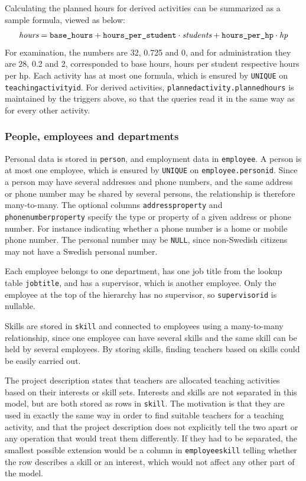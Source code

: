 \documentclass[a4paper]{scrartcl}
\renewcommand{\_}{\textunderscore\allowbreak}
\begin{document}
Calculating the planned hours for derived activities can be summarized as a sample formula, viewed as below:
\[
  \textit{hours} = \texttt{base\_hours} + \texttt{hours\_per\_student} \cdot \textit{students} + \texttt{hours\_per\_hp} \cdot \textit{hp}
\]
For examination, the numbers are 32, 0.725 and 0, and for administration they are 28, 0.2 and 2, corresponded to base hours, hours per student respective hours per hp. Each activity has at most one formula, which is ensured by \texttt{UNIQUE} on \texttt{teaching\_activity\_id}. For derived activities, \texttt{planned\_activity.planned\_hours} is maintained by the triggers above, so that the queries read it in the same way as for every other activity.

\subsubsection{People, employees and departments}

Personal data is stored in \texttt{person}, and employment data in \texttt{employee}. A person is at most one employee, which is ensured by \texttt{UNIQUE} on \texttt{employee.person\_id}. Since a person may have several addresses and phone numbers, and the same address or phone number may be shared by several persons, the relationship is therefore many-to-many. The optional columns \texttt{address\_property} and \texttt{phone\_number\_property} specify the type or property of a given address or phone number. For instance indicating whether a phone number is a home or mobile phone number. The personal number may be \texttt{NULL}, since non-Swedish citizens may not have a Swedish personal number.

Each employee belongs to one department, has one job title from the lookup table \texttt{job\_title}, and has a supervisor, which is another employee. Only the employee at the top of the hierarchy has no supervisor, so \texttt{supervisor\_id} is nullable.

Skills are stored in \texttt{skill} and connected to employees using a many-to-many relationship, since one employee can have several skills and the same skill can be held by several employees. By storing skills, finding teachers based on skills could be easily carried out.

The project description states that teachers are allocated teaching activities based on their interests or skill sets. Interests and skills are not separated in this model, but are both stored as rows in \texttt{skill}. The motivation is that they are used in exactly the same way in order to find suitable teachers for a teaching activity, and that the project description does not explicitly tell the two apart or any operation that would treat them differently. If they had to be separated, the smallest possible extension would be a column in \texttt{employee\_skill} telling whether the row describes a skill or an interest, which would not affect any other part of the model.
\end{document}
